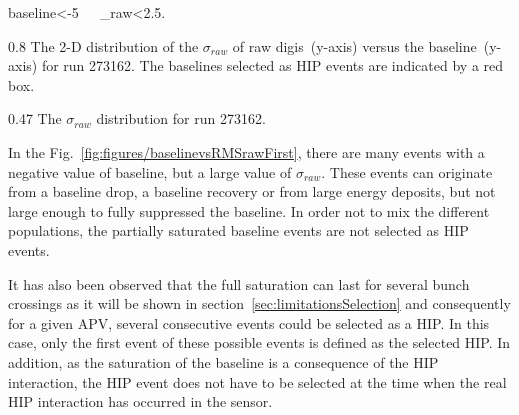 {
baseline<-5~~~\sigma_{raw}<2.5.
}


                 {0.8}       %
                 {The 2-D distribution of the $\sigma_{raw}$ of raw digis~(y-axis) versus the baseline~(y-axis) for run 273162. The baselines selected as HIP events are indicated by a red box. } %




                 {0.47}       %
                 {The $\sigma_{raw}$ distribution for run 273162. }

In the Fig.~\ref{fig:figures/baselinevsRMSrawFirst}, there are many events with a negative value of baseline, but a large value of $\sigma_{raw}$. These events can originate from a baseline drop, a baseline recovery or from large energy deposits, but not large enough to fully suppressed the baseline. In order not to mix the different populations, the partially saturated baseline events are not selected as HIP events. 

It has also been observed that the full saturation can last for several bunch crossings as it will be shown in section~\ref{sec:limitationsSelection} and consequently for a given APV, several consecutive events could be selected as a HIP. In this case, only the first event of these possible events is defined as the selected HIP. In addition, as the saturation of the baseline is a consequence of the HIP interaction, the HIP event does not have to be selected at the time when the real HIP interaction has occurred in the sensor. 


